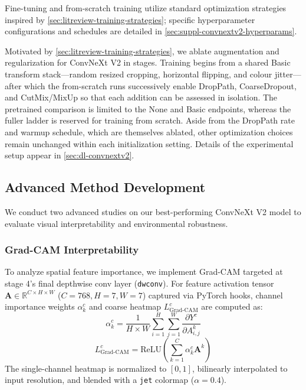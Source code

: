 Fine-tuning and from-scratch training utilize standard optimization strategies inspired by \cref{sec:litreview-training-strategies}; specific hyperparameter configurations and schedules are detailed in \cref{sec:suppl-convnextv2-hyperparams}.

Motivated by \cref{sec:litreview-training-strategies}, we ablate augmentation and regularization for ConvNeXt V2 in stages. Training begins from a shared Basic transform stack---random resized cropping, horizontal flipping, and colour jitter---after which the from-scratch runs successively enable DropPath, CoarseDropout, and CutMix/MixUp so that each addition can be assessed in isolation. The pretrained comparison is limited to the None and Basic endpoints, whereas the fuller ladder is reserved for training from scratch. Aside from the DropPath rate and warmup schedule, which are themselves ablated, other optimization choices remain unchanged within each initialization setting. Details of the experimental setup appear in \cref{sec:dl-convnextv2}.

\subsection{Advanced Method Development}
\label{sec:adv-method}
We conduct two advanced studies on our best-performing ConvNeXt V2 model to evaluate visual interpretability and environmental robustness.

\subsubsection{Grad-CAM Interpretability}
To analyze spatial feature importance, we implement Grad-CAM \cite{selvaraju2017grad} targeted at stage 4's final depthwise conv layer (\texttt{dwconv}). For feature activation tensor $\mathbf{A} \in \mathbb{R}^{C \times H \times W}$ ($C=768, H=7, W=7$) captured via PyTorch hooks, channel importance weights $\alpha_k^c$ and coarse heatmap $L_{\text{Grad-CAM}}^c$ are computed as:
\begin{equation}
  \alpha_k^c = \frac{1}{H \times W} \sum_{i=1}^{H} \sum_{j=1}^{W} \frac{\partial Y^c}{\partial A_{i,j}^k}
\end{equation}
\begin{equation}
  L_{\text{Grad-CAM}}^c = \text{ReLU}\left( \sum_{k=1}^{C} \alpha_k^c \mathbf{A}^k \right)
\end{equation}
The single-channel heatmap is normalized to $[0, 1]$, bilinearly interpolated to input resolution, and blended with a \texttt{jet} colormap ($\alpha = 0.4$).

